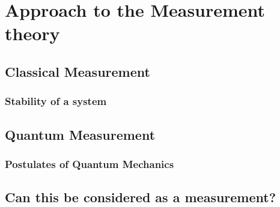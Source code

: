 \chapter{Approach to the Measurement theory}

\section{Classical Measurement}

\subsection{Stability of a system}


\section{Quantum Measurement}

\subsection{Postulates of Quantum Mechanics}


\section{Can this be considered as a measurement?}